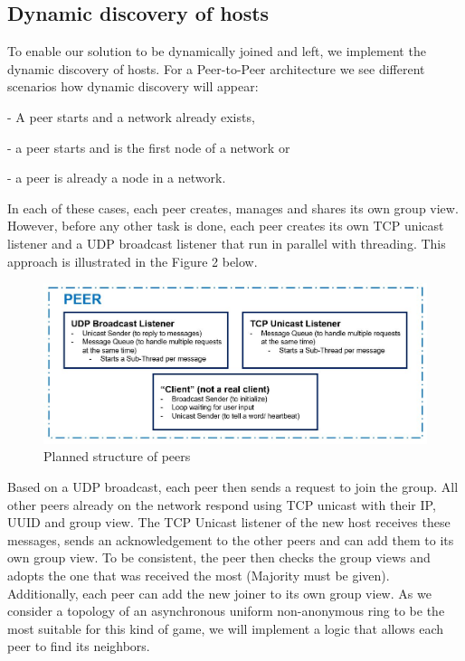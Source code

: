 \documentclass[runningheads]{llncs}
\begin{document}
    \subsection{Dynamic discovery of hosts}
        To enable our solution to be dynamically joined and left, we implement the dynamic discovery of hosts. For a Peer-to-Peer architecture we see different scenarios how dynamic discovery will appear: 
        
        - A peer starts and a network already exists, 
        
        - a peer starts and is the first node of a network or 
        
        - a peer is already a node in a network.
        
        In each of these cases, each peer creates, manages and shares its own group view. However, before any other task is done, each peer creates its own TCP unicast listener and a UDP broadcast listener that run in parallel with threading. This approach is illustrated in the Figure 2 below.
        
        \begin{figure}[H]
        \includegraphics[width=\textwidth]{Peer structure.JPG}
        \caption{Planned structure of peers} \label{fig:peer-structure}
        \end{figure}
        
        Based on a UDP broadcast, each peer then sends a request to join the group. All other peers already on the network respond using TCP unicast with their IP, UUID and group view.  The TCP Unicast listener of the new host receives these messages, sends an acknowledgement to the other peers and can add them to its own group view. To be consistent, the peer then checks the group views and adopts the one that was received the most (Majority must be given). Additionally, each peer can add the new joiner to its own group view. As we consider a topology of an asynchronous uniform non-anonymous ring to be the most suitable for this kind of game, we will implement a logic that allows each peer to find its neighbors.
        
\end{document}
